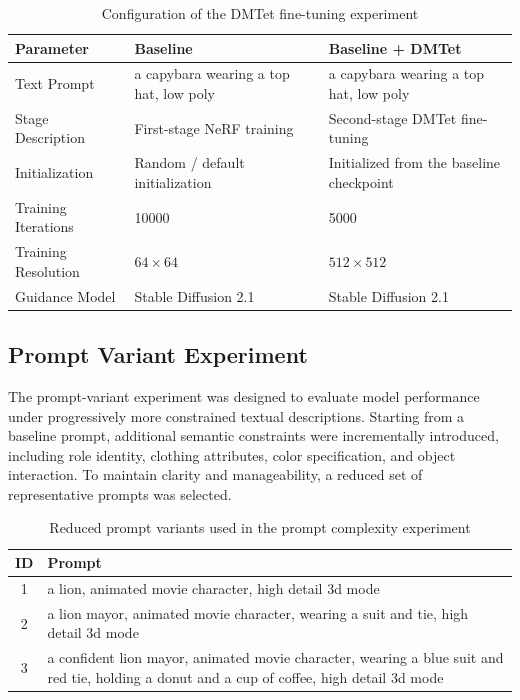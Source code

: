 \documentclass[sigconf, final, screen]{acmart}
\begin{document}
\begin{table}[h]
\caption{Configuration of the DMTet fine-tuning experiment}
\label{tab:dmtet_config}
\centering
\begin{tabularx}{\linewidth}{lXX}
\toprule
\textbf{Parameter} & \textbf{Baseline} & \textbf{Baseline + DMTet} \\
\midrule
Text Prompt & a capybara wearing a top hat, low poly & a capybara wearing a top hat, low poly \\
Stage Description & First-stage NeRF training & Second-stage DMTet fine-tuning \\
Initialization & Random / default initialization & Initialized from the baseline checkpoint \\
Training Iterations & 10000 & 5000 \\
Training Resolution & $64 \times 64$ & $512 \times 512$ \\
Guidance Model & Stable Diffusion 2.1 & Stable Diffusion 2.1 \\
\bottomrule
\end{tabularx}
\end{table}

\subsection{Prompt Variant Experiment}
The prompt-variant experiment was designed to evaluate model performance under progressively more constrained textual descriptions. Starting from a baseline prompt, additional semantic constraints were incrementally introduced, including role identity, clothing attributes, color specification, and object interaction. To maintain clarity and manageability, a reduced set of representative prompts was selected.

\begin{table}[h]
\caption{Reduced prompt variants used in the prompt complexity experiment}
\label{tab:prompt_variants}
\centering
\begin{tabularx}{\linewidth}{cX}
\toprule
ID & Prompt \\
\midrule
1 & a lion, animated movie character, high detail 3d mode \\
2 & a lion mayor, animated movie character, wearing a suit and tie, high detail 3d mode \\
3 & a confident lion mayor, animated movie character, wearing a blue suit and red tie, holding a donut and a cup of coffee, high detail 3d mode \\
\bottomrule
\end{tabularx}
\end{table}
\end{document}
